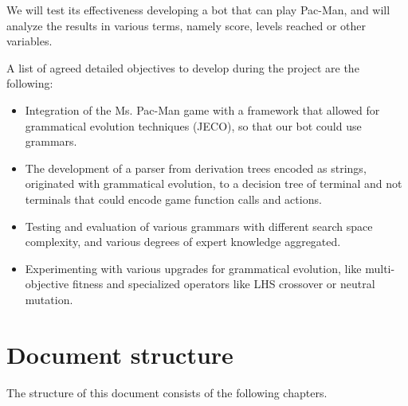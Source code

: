 We will test its effectiveness developing a bot that can play Pac-Man, and will analyze the results in various terms, namely score, levels reached or other variables.
 
A list of agreed detailed objectives to develop during the project are the following:
\begin{itemize}
\item Integration of the Ms. Pac-Man game with a framework that allowed for grammatical evolution techniques (JECO), so that our bot could use grammars.

\item The development of a parser from derivation trees encoded as strings, originated with grammatical evolution, to a decision tree of terminal and not terminals that could encode game function calls and actions.

\item Testing and evaluation of various grammars with different search space complexity, and various degrees of expert knowledge aggregated.

\item Experimenting with various upgrades for grammatical evolution, like multi-objective fitness and specialized operators like LHS crossover or neutral mutation. 
\end{itemize}

\section{Document structure}
The structure of this document consists of the following chapters.

